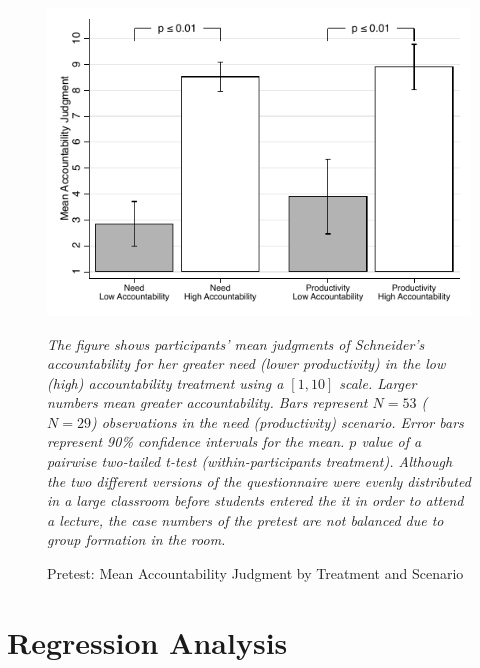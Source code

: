 \documentclass[smallcondensed]{svjour3}
\begin{document}
\begin{figure}[ht]
   \centering
   \includegraphics[scale=0.7]{figures/pilot_accountability.pdf}
   \begin{minipage}{10cm}
   \footnotesize
   \emph{The figure shows participants' mean judgments of Schneider's accountability for her greater need (lower productivity) in the low (high) accountability treatment using a $[1,10]$ scale. Larger numbers mean greater accountability. Bars represent $N=53$ ($N=29$) observations in the need (productivity) scenario. Error bars represent 90\% confidence intervals for the mean. $p$ value of a pairwise two-tailed t-test (within-participants treatment). Although the two different versions of the questionnaire were evenly distributed in a large classroom before students entered the it in order to attend a lecture, the case numbers of the pretest are not balanced due to group formation in the room.}
   \end{minipage}
   \caption{Pretest: Mean Accountability Judgment by Treatment and Scenario}
   \label{fig:pretest}
\end{figure}
%
\clearpage
%
\section{Regression Analysis}\label{sec:regression}
%
\end{document}
